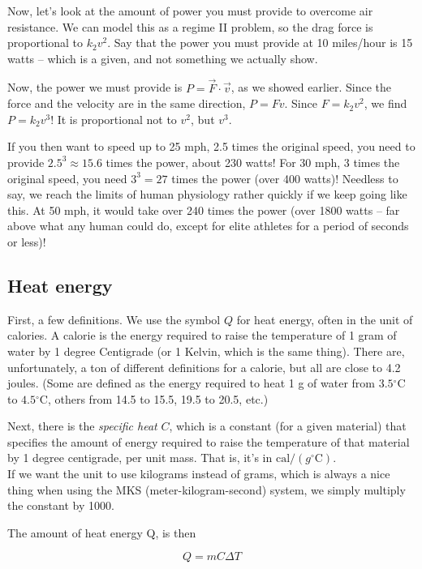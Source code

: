 Now, let's look at the amount of power you must provide to overcome air resistance. We can model this as a regime II problem, so the drag force is proportional to $k_2 v^2$. Say that the power you must provide at 10 miles/hour is 15 watts -- which is a given, and not something we actually show.

Now, the power we must provide is $P = \vec{F} \cdot \vec{v}$, as we showed earlier. Since the force and the velocity are in the same direction, $P = F v$. Since $F = k_2 v^2$, we find $P = k_2 v^3$! It is proportional not to $v^2$, but $v^3$.

If you then want to speed up to 25 mph, 2.5 times the original speed, you need to provide $2.5^{3} \approx 15.6$ times the power, about 230 watts! For 30 mph, 3 times the original speed, you need $3^3 = 27$ times the power (over 400 watts)! Needless to say, we reach the limits of human physiology rather quickly if we keep going like this. At 50 mph, it would take over 240 times the power (over 1800 watts -- far above what any human could do, except for elite athletes for a period of seconds or less)!

\subsection{Heat energy}

First, a few definitions. We use the symbol $Q$ for heat energy, often in the unit of calories. A calorie is the energy required to raise the temperature of 1 gram of water by 1 degree Centigrade (or 1 Kelvin, which is the same thing). There are, unfortunately, a ton of different definitions for a calorie, but all are close to 4.2 joules. (Some are defined as the energy required to heat 1 g of water from $3.5 {}^\circ$C to $4.5 {}^\circ$C, others from 14.5 to 15.5, 19.5 to 20.5, etc.)

Next, there is the \emph{specific heat} $C$, which is a constant (for a given material) that specifies the amount of energy required to raise the temperature of that material by 1 degree centigrade, per unit mass. That is, it's in $\text{cal}/(g {}^\circ\text{C})$.\\
If we want the unit to use kilograms instead of grams, which is always a nice thing when using the MKS (meter-kilogram-second) system, we simply multiply the constant by 1000.

The amount of heat energy Q, is then

\begin{equation}
Q = m C \Delta T
\end{equation}

